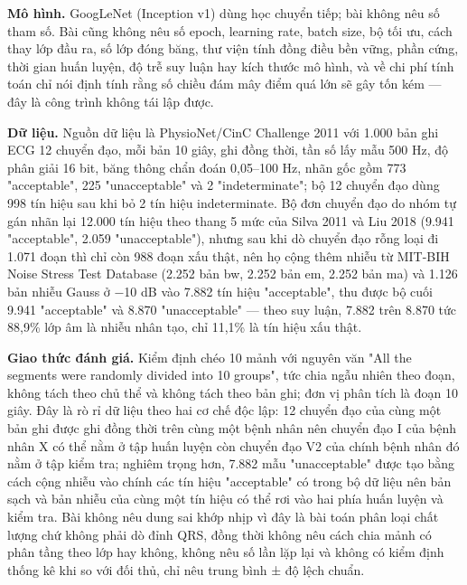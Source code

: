 \documentclass[12pt,a4paper]{article}
\begin{document}
\noindent \textbf{Mô hình.} GoogLeNet (Inception v1) dùng học chuyển tiếp; bài không nêu số tham số. Bài cũng không nêu số epoch, learning rate, batch size, bộ tối ưu, cách thay lớp đầu ra, số lớp đóng băng, thư viện tính đồng điều bền vững, phần cứng, thời gian huấn luyện, độ trễ suy luận hay kích thước mô hình, và về chi phí tính toán chỉ nói định tính rằng số chiều đám mây điểm quá lớn sẽ gây tốn kém — đây là công trình không tái lập được.\par\vspace{3pt}
\noindent \textbf{Dữ liệu.} Nguồn dữ liệu là PhysioNet/CinC Challenge 2011 với 1.000 bản ghi ECG 12 chuyển đạo, mỗi bản 10 giây, ghi đồng thời, tần số lấy mẫu 500 Hz, độ phân giải 16 bit, băng thông chẩn đoán 0,05–100 Hz, nhãn gốc gồm 773 "acceptable", 225 "unacceptable" và 2 "indeterminate"; bộ 12 chuyển đạo dùng 998 tín hiệu sau khi bỏ 2 tín hiệu indeterminate. Bộ đơn chuyển đạo do nhóm tự gán nhãn lại 12.000 tín hiệu theo thang 5 mức của Silva 2011 và Liu 2018 (9.941 "acceptable", 2.059 "unacceptable"), nhưng sau khi dò chuyển đạo rỗng loại đi 1.071 đoạn thì chỉ còn 988 đoạn xấu thật, nên họ cộng thêm nhiễu từ MIT-BIH Noise Stress Test Database (2.252 bản bw, 2.252 bản em, 2.252 bản ma) và 1.126 bản nhiễu Gauss ở −10 dB vào 7.882 tín hiệu "acceptable", thu được bộ cuối 9.941 "acceptable" và 8.870 "unacceptable" — theo suy luận, 7.882 trên 8.870 tức 88,9\% lớp âm là nhiễu nhân tạo, chỉ 11,1\% là tín hiệu xấu thật.\par\vspace{3pt}
\noindent \textbf{Giao thức đánh giá.} Kiểm định chéo 10 mảnh với nguyên văn "All the segments were randomly divided into 10 groups", tức chia ngẫu nhiên theo đoạn, không tách theo chủ thể và không tách theo bản ghi; đơn vị phân tích là đoạn 10 giây. Đây là rò rỉ dữ liệu theo hai cơ chế độc lập: 12 chuyển đạo của cùng một bản ghi được ghi đồng thời trên cùng một bệnh nhân nên chuyển đạo I của bệnh nhân X có thể nằm ở tập huấn luyện còn chuyển đạo V2 của chính bệnh nhân đó nằm ở tập kiểm tra; nghiêm trọng hơn, 7.882 mẫu "unacceptable" được tạo bằng cách cộng nhiễu vào chính các tín hiệu "acceptable" có trong bộ dữ liệu nên bản sạch và bản nhiễu của cùng một tín hiệu có thể rơi vào hai phía huấn luyện và kiểm tra. Bài không nêu dung sai khớp nhịp vì đây là bài toán phân loại chất lượng chứ không phải dò đỉnh QRS, đồng thời không nêu cách chia mảnh có phân tầng theo lớp hay không, không nêu số lần lặp lại và không có kiểm định thống kê khi so với đối thủ, chỉ nêu trung bình ± độ lệch chuẩn.\par\vspace{3pt}
\end{document}

